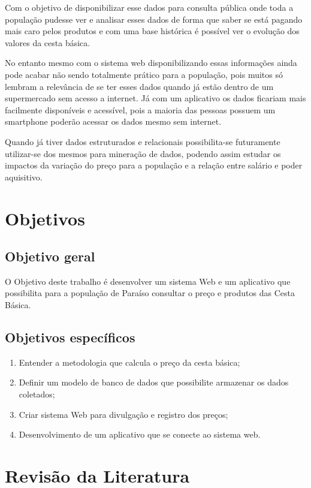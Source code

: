 \documentclass{ifto-tex}
\begin{document}
		Com o objetivo de disponibilizar esse dados para consulta pública onde toda a população pudesse ver e analisar esses dados de forma que saber se está pagando mais caro pelos produtos e com uma base histórica é possível ver o evolução dos valores da cesta básica.
		
		No entanto mesmo com o sistema web disponibilizando essas informações ainda pode acabar não sendo totalmente prático para a população, pois muitos só lembram a relevância de se ter esses dados quando já estão dentro de um supermercado sem acesso a internet. Já com um aplicativo os dados ficariam mais facilmente disponíveis e acessível, pois a maioria das pessoas possuem um smartphone poderão acessar os dados mesmo sem internet.
		
		Quando já tiver dados estruturados e relacionais possibilita-se futuramente utilizar-se dos mesmos para mineração de dados, podendo assim estudar os impactos da variação do preço para a população e a relação entre salário e poder aquisitivo.
		
	
\chapter{Objetivos}
	
	\section{Objetivo geral}
	
		O Objetivo deste trabalho é desenvolver um sistema Web e um aplicativo que possibilita para a população de Paraíso consultar o preço e produtos das Cesta Básica.
	
	\section{Objetivos específicos}
	
		\begin{enumerate}
			\item Entender a metodologia que calcula o preço da cesta básica;
			\item Definir um modelo de banco de dados que possibilite armazenar os dados coletados;
			\item Criar sistema Web para divulgação e registro dos preços;
			\item Desenvolvimento de um aplicativo que se conecte ao sistema web.
		\end{enumerate}

\chapter{Revisão da Literatura}
\end{document}
